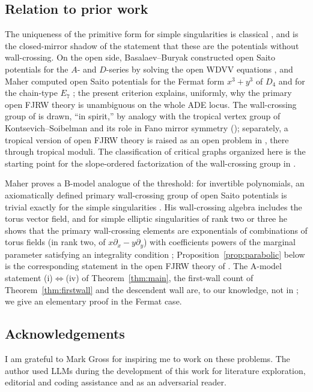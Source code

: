 \documentclass[11pt]{amsart}
\theoremstyle{definition}
\theoremstyle{remark}
\begin{document}
\subsection*{Relation to prior work}
The uniqueness of the primitive form for simple singularities is classical
\cite{Saito83,NoumiYamada98}, and is the closed-mirror shadow of the statement
that these are the potentials without wall-crossing. On the open side,
Basalaev--Buryak constructed open Saito potentials for the $A$- and $D$-series
by solving the open WDVV equations \cite{BB21}, and Maher computed open
Saito potentials for the Fermat form $x^3+y^3$ of $D_4$ and for the
chain-type $E_7$ \cite[Examples~4.2.3 and~4.2.4]{Maher}; the present criterion
explains, uniformly, why the primary open FJRW theory is unambiguous on the
whole ADE locus. The wall-crossing group of \cite{GKT} is drawn, ``in spirit,'' by analogy
with the tropical vertex group of Kontsevich--Soibelman \cite{KS06} and its role
in Fano mirror symmetry \cite{GPS10,Gross10} (\cite[Remark~0.8]{GKT}); separately, a
tropical version of open FJRW theory is raised as an open problem in
\cite[\S6]{GKTsurvey}, there through tropical moduli. The classification of critical
graphs organized here is the starting point for the slope-ordered
factorization of the wall-crossing group in \cite{companion}.

Maher proves a B-model analogue of the threshold: for invertible polynomials,
an axiomatically defined primary wall-crossing group of open Saito potentials
is trivial exactly for the simple singularities
\cite[Proposition~1.0.5 and Corollary~5.2.6]{Maher}.  His wall-crossing
algebra \cite[(5.2.1)]{Maher} includes the torus vector field, and for
simple elliptic singularities of rank two or three he shows that the primary
wall-crossing elements are exponentials of combinations of torus fields
(in rank two, of $x\partial_x-y\partial_y$) with coefficients powers of the
marginal parameter satisfying an integrality condition
\cite[Propositions~1.0.5 and~5.2.10]{Maher}; Proposition~\ref{prop:parabolic}
below is the corresponding statement in the open FJRW theory of \cite{GKT}.
The A-model statement (i)$\Leftrightarrow$(iv) of Theorem~\ref{thm:main}, the
first-wall count of Theorem~\ref{thm:firstwall} and the descendent wall are,
to our knowledge, not in \cite{Maher}; we give an elementary proof in the
Fermat case.

\subsection*{Acknowledgements}
I am grateful to Mark Gross for inspiring me to work on these problems.
The author used LLMs during the development of this work for literature exploration, editorial and coding assistance and as an adversarial reader.
\end{document}
